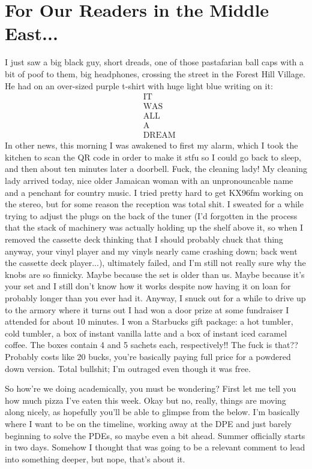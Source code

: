 \documentclass[12pt]{article}
\begin{document}
\newpage

\section*{For Our Readers in the Middle East...}
I just saw a big black guy, short dreads, one of those pastafarian ball caps with a bit of poof to them, big headphones, crossing the street in the Forest Hill Village. He had on an over-sized purple t-shirt with huge light blue writing on it:
\begin{align*}
& \text{IT} \\
& \text{WAS} \\
& \text{ALL} \\
& \text{A} \\
& \text{DREAM}
\end{align*}
In other news, this morning I was awakened to first my alarm, which I took the kitchen to scan the QR code in order to make it stfu so I could go back to sleep, and then about ten minutes later a doorbell. Fuck, the cleaning lady! My cleaning lady arrived today, nice older Jamaican woman with an unpronouncable name and a penchant for country music. I tried pretty hard to get KX96fm working on the stereo, but for some reason the reception was total shit. I sweated for a while trying to adjust the plugs on the back of the tuner (I'd forgotten in the process that the stack of machinery was actually holding up the shelf above it, so when I removed the cassette deck thinking that I should probably chuck that thing anyway, your vinyl player and my vinyls nearly came crashing down; back went the cassette deck player...), ultimately failed, and I'm still not really sure why the knobs are so finnicky. Maybe because the set is older than us. Maybe because it's your set and I still don't know how it works despite now having it on loan for probably longer than you ever had it. Anyway, I snuck out for a while to drive up to the armory where it turns out I had won a door prize at some fundraiser I attended for about 10 minutes. I won a Starbucks gift package: a hot tumbler, cold tumbler, a box of instant vanilla latte and a box of instant iced caramel coffee. The boxes contain 4 and 5 sachets each, respectively!! The fuck is that?? Probably costs like 20 bucks, you're basically paying full price for a powdered down version. Total bullshit; I'm outraged even though it was free.

So how're we doing academically, you must be wondering? First let me tell you how much pizza I've eaten this week. Okay but no, really, things are moving along nicely, as hopefully you'll be able to glimpse from the below. I'm basically where I want to be on the timeline, working away at the DPE and just barely beginning to solve the PDEs, so maybe even a bit ahead. Summer officially starts in two days. Somehow I thought that was going to be a relevant comment to lead into something deeper, but nope, that's about it. 
\end{document}
